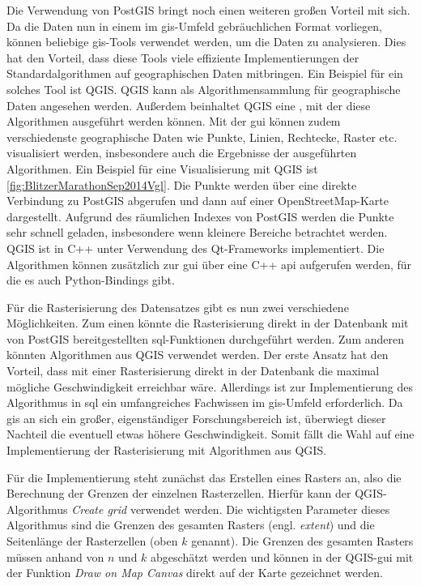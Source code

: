 Die Verwendung von PostGIS bringt noch einen weiteren großen Vorteil mit sich.
Da die Daten nun in einem im \acrshort{gis}-Umfeld gebräuchlichen Format vorliegen, können beliebige \acrshort{gis}-Tools verwendet werden, um die Daten zu analysieren.
Dies hat den Vorteil, dass diese Tools viele effiziente Implementierungen der Standardalgorithmen auf geographischen Daten mitbringen.
Ein Beispiel für ein solches Tool ist QGIS.
QGIS kann als Algorithmensammlung für geographische Daten angesehen werden.
Außerdem beinhaltet QGIS eine , mit der diese Algorithmen ausgeführt werden können.
Mit der \acrshort{gui} können zudem verschiedenste geographische Daten wie Punkte, Linien, Rechtecke, Raster etc. visualisiert werden, insbesondere auch die Ergebnisse der ausgeführten Algorithmen.
Ein Beispiel für eine Visualisierung mit QGIS ist \autoref{fig:BlitzerMarathonSep2014Vgl}.
Die Punkte werden über eine direkte Verbindung zu PostGIS abgerufen und dann auf einer OpenStreetMap-Karte dargestellt.
Aufgrund des räumlichen Indexes von PostGIS werden die Punkte sehr schnell geladen, insbesondere wenn kleinere Bereiche betrachtet werden.
QGIS ist in C++ unter Verwendung des Qt-Frameworks implementiert.
Die Algorithmen können zusätzlich zur \acrshort{gui} über eine C++ \acrshort{api} aufgerufen werden, für die es auch Python-Bindings gibt.

Für die Rasterisierung des Datensatzes gibt es nun zwei verschiedene Möglichkeiten.
Zum einen könnte die Rasterisierung direkt in der Datenbank mit von PostGIS bereitgestellten \acrshort{sql}-Funktionen durchgeführt werden.
Zum anderen könnten Algorithmen aus QGIS verwendet werden.
Der erste Ansatz hat den Vorteil, dass mit einer Rasterisierung direkt in der Datenbank die maximal mögliche Geschwindigkeit erreichbar wäre.
Allerdings ist zur Implementierung des Algorithmus in \acrshort{sql} ein umfangreiches Fachwissen im \acrshort{gis}-Umfeld erforderlich.
Da \acrshort{gis} an sich ein großer, eigenständiger Forschungsbereich ist, überwiegt dieser Nachteil die eventuell etwas höhere Geschwindigkeit.
Somit fällt die Wahl auf eine Implementierung der Rasterisierung mit Algorithmen aus QGIS.

Für die Implementierung steht zunächst das Erstellen eines Rasters an, also die Berechnung der Grenzen der einzelnen Rasterzellen.
Hierfür kann der QGIS-Algorithmus \emph{Create grid} verwendet werden.
Die wichtigsten Parameter dieses Algorithmus sind die Grenzen des gesamten Rasters (engl. \emph{extent}) und die Seitenlänge der Rasterzellen (oben $k$ genannt).
Die Grenzen des gesamten Rasters müssen anhand von $n$ und $k$ abgeschätzt werden und können in der QGIS-\acrshort{gui} mit der Funktion \emph{Draw on Map Canvas} direkt auf der Karte gezeichnet werden.
